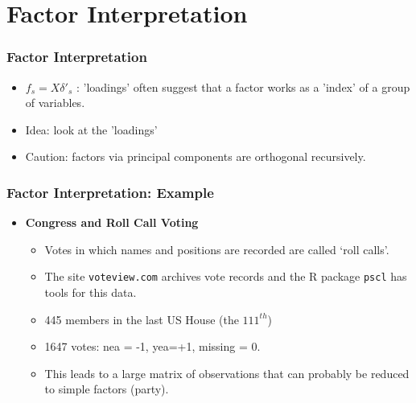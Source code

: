 \documentclass[
  shownotes,
  xcolor={svgnames},
  hyperref={colorlinks,citecolor=DarkBlue,linkcolor=DarkRed,urlcolor=DarkBlue}
  , aspectratio=169]{beamer}
\newcommand{\theme}{\color{andesred}}
\newcommand{\gr}{\color{black!60}}
\newcommand{\nv}{\color{Navy}}
\begin{document}
\section{Factor Interpretation}
\begin{frame}
\frametitle{Factor Interpretation}

\begin{itemize}
\item $f_s = X\delta'_s$ : 'loadings' often suggest that a factor works as a 'index' of a group of variables.
\bigskip
\item Idea: look at the 'loadings'
\bigskip
\item Caution: factors via principal components are orthogonal recursively.
\end{itemize}


\end{frame}


\begin{frame}[fragile]
\frametitle{Factor Interpretation: Example}


\begin{itemize}
\item {\bf Congress and \theme Roll Call Voting}
\bigskip
\begin{itemize}
  \item Votes in which names and positions are recorded are called `roll calls'.
  \medskip
  \item The site {\tt voteview.com} archives vote records and the R package { \tt pscl} has tools for this data.
  \medskip
  \item 445 members in the last US House  (the $111^{th}$)
  \medskip
  \item 1647 votes:  \theme nea = -1, \nv yea=+1, \gr missing = 0.
  \medskip
  \item This leads to a large matrix of observations that can probably be reduced to simple factors {\gr (party)}.
\end{itemize}
\end{itemize}





\end{frame}
\end{document}
